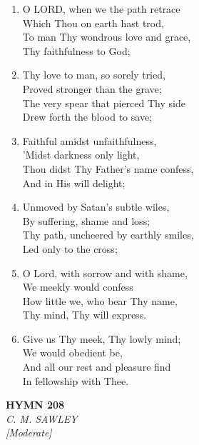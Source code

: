 \documentclass[11pt,a4paper]{article}
\begin{document}
\begin{enumerate}
    \item O LORD, when we the path retrace \\
        Which Thou on earth hast trod, \\
        To man Thy wondrous love and grace, \\
        Thy faithfulness to God;

    \item Thy love to man, so sorely tried, \\
        Proved stronger than the grave; \\
        The very spear that pierced Thy side \\
        Drew forth the blood to save;

    \item Faithful amidst unfaithfulness, \\
        'Midst darkness only light, \\
        Thou didst Thy Father's name confess, \\
        And in His will delight;

    \item Unmoved by Satan's subtle wiles, \\
        By suffering, shame and loss; \\
        Thy path, uncheered by earthly smiles, \\
        Led only to the cross;

    \item O Lord, with sorrow and with shame, \\
        We meekly would confess \\
        How little we, who bear Thy name, \\
        Thy mind, Thy will express.

    \item Give us Thy meek, Thy lowly mind; \\
        We would obedient be, \\
        And all our rest and pleasure find \\
        In fellowship with Thee.

\end{enumerate}

\newpage
\begin{center}
    {\Large \textbf{HYMN 208}}
    \\
    \textit{C. M. SAWLEY}
    \\
    \textit{\small [Moderate]}
\end{center}
\vspace{1em}
\end{document}
